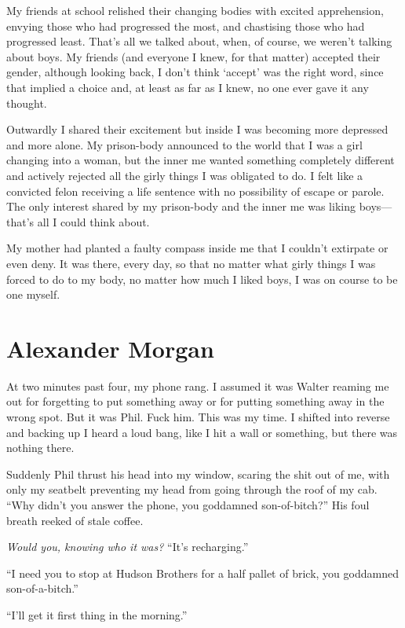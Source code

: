 My friends at school relished their changing bodies with excited
apprehension, envying those who had progressed the most, and chastising
those who had progressed least. That's all we talked about, when, of
course, we weren't talking about boys. My friends (and everyone I knew,
for that matter) accepted their gender, although looking back, I don't
think `accept' was the right word, since that implied a choice and, at
least as far as I knew, no one ever gave it any thought.

Outwardly I shared their excitement but inside I was becoming more
depressed and more alone. My prison-body announced to the world that I
was a girl changing into a woman, but the inner me wanted something
completely different and actively rejected all the girly things I was
obligated to do. I felt like a convicted felon receiving a life sentence
with no possibility of escape or parole. The only interest shared by my
prison-body and the inner me was liking boys---that's all I could think
about.

My mother had planted a faulty compass inside me that I couldn't
extirpate or even deny. It was there, every day, so that no matter what
girly things I was forced to do to my body, no matter how much I liked
boys, I was on course to be one myself.

\chapter{Alexander Morgan}

\titlemark

At two minutes past four, my phone rang. I assumed it was Walter reaming
me out for forgetting to put something away or for putting something
away in the wrong spot. But it was Phil. Fuck him. This was my time. I
shifted into reverse and backing up I heard a loud bang, like I hit a
wall or something, but there was nothing there.

Suddenly Phil thrust his head into my window, scaring the shit out of
me, with only my seatbelt preventing my head from going through the roof
of my cab. ``Why didn't you answer the phone, you goddamned
son-of-bitch?'' His foul breath reeked of stale coffee.

\emph{Would you, knowing who it was?} ``It's recharging.''

``I need you to stop at Hudson Brothers for a half pallet of brick, you
goddamned son-of-a-bitch.''

``I'll get it first thing in the morning.''


